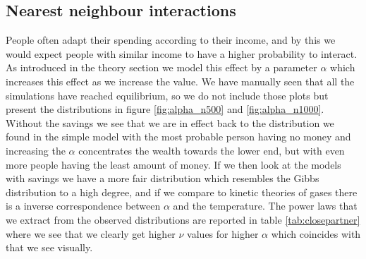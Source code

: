 \documentclass[a4paper,11pt]{article}
\begin{document}
{\subsection{Nearest neighbour interactions}
People often adapt their spending according to their income, and by this we would expect people with similar income to have a higher probability to interact. As introduced in the theory section we model this effect by a parameter $\alpha$ which increases this effect as we increase the value. We have manually seen that all the simulations have reached equilibrium, so we do not include those plots but present the distributions in figure \ref{fig:alpha_n500} and \ref{fig:alpha_n1000}. Without the savings we see that we are in effect back to the distribution we found in the simple model with the most probable person having no money and increasing the $\alpha$ concentrates the wealth towards the lower end, but with even more people having the least amount of money. If we then look at the models with savings we have a more fair distribution which resembles the Gibbs distribution to a high degree, and if we compare to kinetic theories of gases there is a inverse correspondence between $\alpha$ and the temperature. The power laws that we extract from the observed distributions are reported in table \ref{tab:closepartner} where we see that we clearly get higher $\nu$ values for higher $\alpha$ which coincides with that we see visually. 

}
\end{document}
